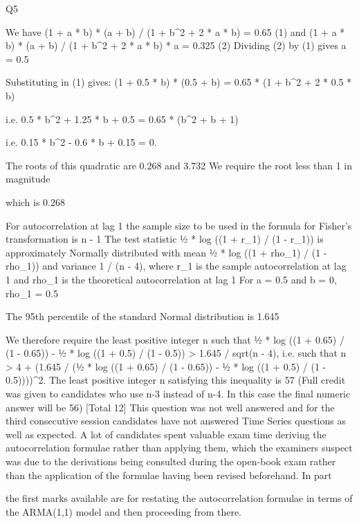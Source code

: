 \documentclass[a4paper,12pt]{article}
\begin{document}
Q5
\item  
We have (1 + a * b) * (a + b) / (1 + b^2 + 2 * a * b) = 0.65 (1) 
and (1 + a * b) * (a + b) / (1 + b^2 + 2 * a * b) * a = 0.325 (2) 
Dividing (2) by (1) gives a = 0.5 \item 
Substituting in (1) gives:
(1 + 0.5 * b) * (0.5 + b) = 0.65 * (1 + b^2 + 2 * 0.5 * b) \item 
i.e. 0.5 * b^2 + 1.25 * b + 0.5 = 0.65 * (b^2 + b + 1) \item 
i.e. 0.15 * b^2 - 0.6 * b + 0.15 = 0. \item 
The roots of this quadratic are 0.268 and 3.732 
We require the root less than 1 in magnitude \item 
which is 0.268 \item 
\item  
For autocorrelation at lag 1 the sample size to be used in the formula for Fisher’s transformation is n - 1 
The test statistic ½ * log ((1 + r_1) / (1 - r_1)) is approximately Normally distributed
with mean ½ * log ((1 + rho_1) / (1 - rho_1)) and variance 1 / (n - 4), where r_1 is
the sample autocorrelation at lag 1 and rho_1 is the theoretical autocorrelation at
lag 1 
For a = 0.5 and b = 0, rho_1 = 0.5 \item 
The 95th percentile of the standard Normal distribution is 1.645 \item 
We therefore require the least positive integer n such that
½ * log ((1 + 0.65) / (1 - 0.65)) - ½ * log ((1 + 0.5) / (1 - 0.5)) > 1.645 / sqrt(n - 4), 
i.e. such that
n > 4 + (1.645 / (½ * log ((1 + 0.65) / (1 - 0.65)) - ½ * log ((1 + 0.5) / (1 - 0.5))))^2. 
The least positive integer n satisfying this inequality is 57 
(Full credit was given to candidates who use n-3 instead of n-4. In this case the final numeric answer will be 56)
[Total 12]
\medskip 
This question was not well answered and for the third consecutive session candidates have not answered Time Series questions as well as expected. A lot of candidates spent valuable exam time deriving the autocorrelation formulae rather than applying them, which the examiners suspect was due to the derivations being consulted during the open-book exam rather than the application of the formulae having been revised beforehand.
In part \item   the first marks available are for restating the autocorrelation formulae in terms of the ARMA(1,1) model and then proceeding from there.
\end{document}
